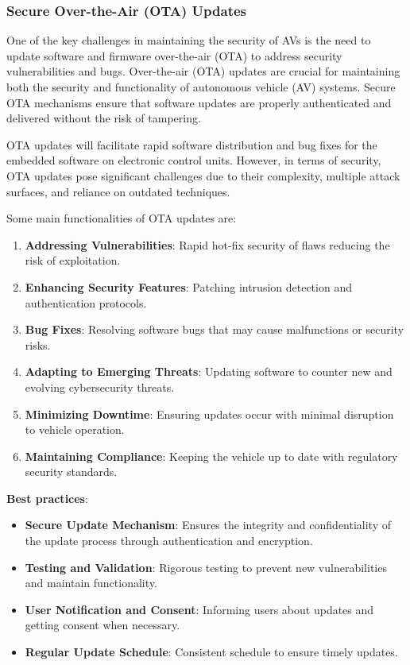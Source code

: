 \subsubsection{Secure Over-the-Air (OTA) Updates}\label{subsubsec:secure-over-the-air-ota-updates}

One of the key challenges in maintaining the security of AVs is the need to update software and firmware over-the-air (OTA) to address security vulnerabilities and bugs.
Over-the-air (OTA) updates are crucial for maintaining both the security and functionality of autonomous vehicle (AV) systems\cite{durlik2022cybersecurity, ahangar2021survey}.
Secure OTA mechanisms ensure that software updates are properly authenticated and delivered without the risk of tampering.

OTA updates will facilitate rapid software distribution and bug fixes for the embedded software on electronic control units.
However, in terms of security, OTA updates pose significant challenges due to their complexity, multiple attack surfaces, and reliance on outdated techniques.

Some main functionalities of OTA updates are:
\begin{enumerate}
    \item \textbf{Addressing Vulnerabilities}: Rapid hot-fix security of flaws reducing the risk of exploitation.
    \item \textbf{Enhancing Security Features}: Patching intrusion detection and authentication protocols.
    \item \textbf{Bug Fixes}: Resolving software bugs that may cause malfunctions or security risks.
    \item \textbf{Adapting to Emerging Threats}: Updating software to counter new and evolving cybersecurity threats.
    \item \textbf{Minimizing Downtime}: Ensuring updates occur with minimal disruption to vehicle operation.
    \item \textbf{Maintaining Compliance}: Keeping the vehicle up to date with regulatory security standards.
\end{enumerate}

\noindent \textbf{Best practices}:
\begin{itemize}
    \item \textbf{Secure Update Mechanism}: Ensures the integrity and confidentiality of the update process through authentication and encryption.
    \item \textbf{Testing and Validation}: Rigorous testing to prevent new vulnerabilities and maintain functionality.
    \item \textbf{User Notification and Consent}: Informing users about updates and getting consent when necessary.
    \item \textbf{Regular Update Schedule}: Consistent schedule to ensure timely updates.
\end{itemize}

